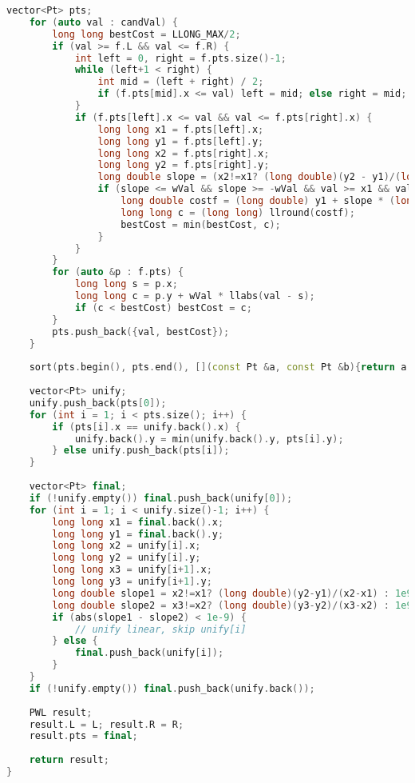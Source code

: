 \begin{lstlisting}[language=C++]
    vector<Pt> pts;
    for (auto val : candVal) {
        long long bestCost = LLONG_MAX/2;
        if (val >= f.L && val <= f.R) {
            int left = 0, right = f.pts.size()-1;
            while (left+1 < right) {
                int mid = (left + right) / 2;
                if (f.pts[mid].x <= val) left = mid; else right = mid;
            }
            if (f.pts[left].x <= val && val <= f.pts[right].x) {
                long long x1 = f.pts[left].x;
                long long y1 = f.pts[left].y;
                long long x2 = f.pts[right].x;
                long long y2 = f.pts[right].y;
                long double slope = (x2!=x1? (long double)(y2 - y1)/(long double)(x2 - x1) : 0);
                if (slope <= wVal && slope >= -wVal && val >= x1 && val <= x2) {
                    long double costf = (long double) y1 + slope * (long double)(val - x1);
                    long long c = (long long) llround(costf);
                    bestCost = min(bestCost, c);
                }
            }
        }
        for (auto &p : f.pts) {
            long long s = p.x;
            long long c = p.y + wVal * llabs(val - s);
            if (c < bestCost) bestCost = c;
        }
        pts.push_back({val, bestCost});
    }
 
    sort(pts.begin(), pts.end(), [](const Pt &a, const Pt &b){return a.x < b.x;});
 
    vector<Pt> unify;
    unify.push_back(pts[0]);
    for (int i = 1; i < pts.size(); i++) {
        if (pts[i].x == unify.back().x) {
            unify.back().y = min(unify.back().y, pts[i].y);
        } else unify.push_back(pts[i]);
    }
 
    vector<Pt> final;
    if (!unify.empty()) final.push_back(unify[0]);
    for (int i = 1; i < unify.size()-1; i++) {
        long long x1 = final.back().x;
        long long y1 = final.back().y;
        long long x2 = unify[i].x;
        long long y2 = unify[i].y;
        long long x3 = unify[i+1].x;
        long long y3 = unify[i+1].y;
        long double slope1 = x2!=x1? (long double)(y2-y1)/(x2-x1) : 1e9;
        long double slope2 = x3!=x2? (long double)(y3-y2)/(x3-x2) : 1e9;
        if (abs(slope1 - slope2) < 1e-9) {
            // unify linear, skip unify[i]
        } else {
            final.push_back(unify[i]);
        }
    }
    if (!unify.empty()) final.push_back(unify.back());
 
    PWL result;
    result.L = L; result.R = R;
    result.pts = final;
 
    return result;
}
 

\end{lstlisting}
